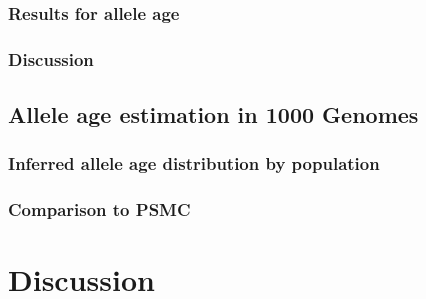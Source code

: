 %
\subsubsection{Results for allele age}
%


%

%


%

%



%

%



%
\subsubsection{Discussion}
%



%
\subsection{Allele age estimation in 1000 Genomes}
%


%
\subsubsection{Inferred allele age distribution by population}
%


%
\subsubsection{Comparison to PSMC}
%


%
\section{Discussion}
%
